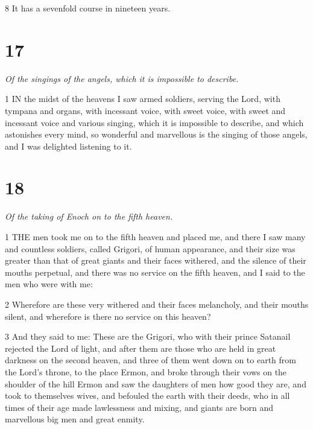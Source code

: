 \par 8 It has a sevenfold course in nineteen years.

\chapter{17}

\par \textit{Of the singings of the angels, which it is impossible to describe.}

\par 1 IN the midst of the heavens I saw armed soldiers, serving the Lord, with tympana and organs, with incessant voice, with sweet voice, with sweet and incessant voice and various singing, which it is impossible to describe, and which astonishes every mind, so wonderful and marvellous is the singing of those angels, and I was delighted listening to it.

\chapter{18}

\par \textit{Of the taking of Enoch on to the fifth heaven.}

\par 1 THE men took me on to the fifth heaven and placed me, and there I saw many and countless soldiers, called Grigori, of human appearance, and their size was greater than that of great giants and their faces withered, and the silence of their mouths perpetual, and there was no service on the fifth heaven, and I said to the men who were with me:

\par 2 Wherefore are these very withered and their faces melancholy, and their mouths silent, and wherefore is there no service on this heaven?

\par 3 And they said to me: These are the Grigori, who with their prince Satanail rejected the Lord of light, and after them are those who are held in great darkness on the second heaven, and three of them went down on to earth from the Lord's throne, to the place Ermon, and broke through their vows on the shoulder of the hill Ermon and saw the daughters of men how good they are, and took to themselves wives, and befouled the earth with their deeds, who in all times of their age made lawlessness and mixing, and giants are born and marvellous big men and great enmity.

